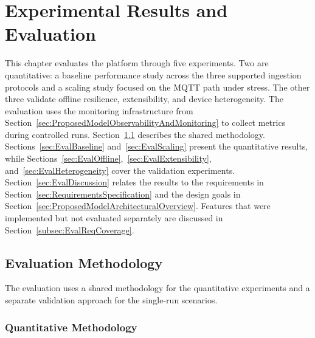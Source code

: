 
%

\chapter{Experimental Results and Evaluation}
\label{cha:Evaluation}

This chapter evaluates the platform through five experiments. Two are quantitative: a baseline performance study across the three supported ingestion protocols and a scaling study focused on the \gls{MQTT} path under stress. The other three validate offline resilience, extensibility, and device heterogeneity. The evaluation uses the monitoring infrastructure from Section~\ref{sec:ProposedModelObservabilityAndMonitoring} to collect metrics during controlled runs. Section~\ref{sec:EvalMethodology} describes the shared methodology. Sections~\ref{sec:EvalBaseline} and~\ref{sec:EvalScaling} present the quantitative results, while Sections~\ref{sec:EvalOffline},~\ref{sec:EvalExtensibility}, and~\ref{sec:EvalHeterogeneity} cover the validation experiments. Section~\ref{sec:EvalDiscussion} relates the results to the requirements in Section~\ref{sec:RequirementsSpecification} and the design goals in Section~\ref{sec:ProposedModelArchitecturalOverview}. Features that were implemented but not evaluated separately are discussed in Section~\ref{subsec:EvalReqCoverage}.

\section{Evaluation Methodology}
\label{sec:EvalMethodology}

The evaluation uses a shared methodology for the quantitative experiments and a separate validation approach for the single-run scenarios.

\subsection{Quantitative Methodology}
\label{subsec:EvalQuantitativeMethodology}

